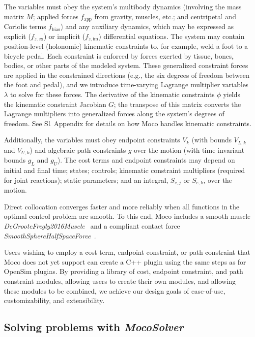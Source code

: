 \documentclass[10pt,letterpaper]{article}
\begin{document}
The variables must obey the system’s multibody dynamics (involving the mass matrix $M$; applied forces $f_\mathrm{app}$ from gravity, muscles, etc.; and centripetal and Coriolis terms $f_\mathrm{bias}$) and any auxiliary dynamics, which may be expressed as explicit ($f_{\dot{z},\mathrm{ex}}$) or implicit ($f_{\dot{z},\mathrm{im}}$) differential equations. The system may contain position-level (holonomic) kinematic constraints to, for example, weld a foot to a bicycle pedal. Each constraint is enforced by forces exerted by tissue, bones, bodies, or other parts of the modeled system. These generalized constraint forces are applied in the constrained directions (e.g., the six degrees of freedom between the foot and pedal), and we introduce time-varying Lagrange multiplier variables $\lambda$ to solve for these forces. The derivative of the kinematic constraints $\phi$ yields the kinematic constraint Jacobian $G$; the transpose of this matrix converts the Lagrange multipliers into generalized forces along the system’s degrees of freedom. See S1 Appendix for details on how Moco handles kinematic constraints.

Additionally, the variables must obey endpoint constraints $V_k$ (with bounds $V_{L,k}$ and $V_{U,k}$) and algebraic path constraints $g$ over the motion (with time-invariant bounds $g_L$ and $g_U$). The cost terms and endpoint constraints may depend on initial and final time; states; controls; kinematic constraint multipliers (required for joint reactions); static parameters; and an integral, $S_{c,j}$ or $S_{e,k}$, over the motion.

Direct collocation converges faster and more reliably when all functions in the optimal control problem are smooth. To this end, Moco includes a smooth muscle \textit{DeGrooteFregly2016Muscle}~\cite{Groote:2016dq} and a compliant contact force \textit{SmoothSphereHalfSpaceForce}~\cite{Serrancoli:2019aa}.

Users wishing to employ a cost term, endpoint constraint, or path constraint that Moco does not yet support can create a C++ plugin using the same steps as for OpenSim plugins. By providing a library of cost, endpoint constraint, and path constraint modules, allowing users to create their own modules, and allowing these modules to be combined, we achieve our design goals of ease-of-use, customizability, and extensibility.


\subsection*{Solving problems with \textit{MocoSolver}}
\end{document}
